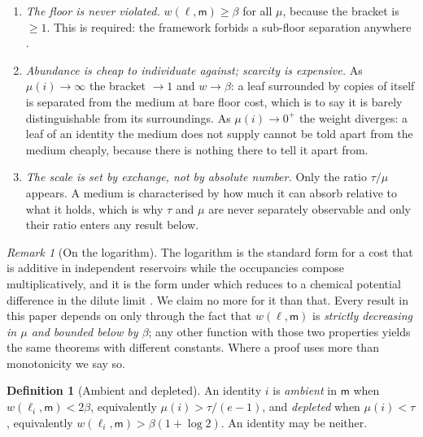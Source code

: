 \documentclass[11pt,twocolumn,a4paper]{article}
\theoremstyle{thmstyle}
\theoremstyle{definition}
\newtheorem{definition}[theorem]{Definition}
\theoremstyle{remark}
\newtheorem{remark}[theorem]{Remark}
\newcommand{\flo}{\beta}
\newcommand{\med}{\mathsf{m}}
\begin{document}
\begin{enumerate}[leftmargin=1.6em,itemsep=2pt]
\item \emph{The floor is never violated.} $w(\ell,\med)\ge\flo$ for all
$\mu$, because the bracket is $\ge 1$. This is required: the framework
forbids a sub-floor separation anywhere
\citep[Thm.~4.3]{sachikonye2026shakespeare}.

\item \emph{Abundance is cheap to individuate against; scarcity is
expensive.} As $\mu(i)\to\infty$ the bracket $\to 1$ and
$w\to\flo$: a leaf surrounded by copies of itself is separated from the
medium at bare floor cost, which is to say it is barely distinguishable
from its surroundings. As $\mu(i)\to 0^+$ the weight diverges: a leaf of
an identity the medium does not supply cannot be told apart from the
medium cheaply, because there is nothing there to tell it apart from.

\item \emph{The scale is set by exchange, not by absolute number.} Only
the ratio $\tau/\mu$ appears. A medium is characterised by how much it can
absorb relative to what it holds, which is why $\tau$ and $\mu$ are never
separately observable and only their ratio enters any result below.
\end{enumerate}

\begin{remark}[On the logarithm]
\label{rem:log}
The logarithm is the standard form for a cost that is additive in
independent reservoirs while the occupancies compose multiplicatively, and
it is the form under which  reduces to a chemical
potential difference in the dilute limit
\citep{beard2007thermo,noor2013thermodynamics}. We claim no more for it
than that. Every result in this paper depends on 
only through the fact that $w(\ell,\med)$ is \emph{strictly decreasing in
$\mu$ and bounded below by $\flo$}; any other function with those two
properties yields the same theorems with different constants. Where a
proof uses more than monotonicity we say so.
\end{remark}

\begin{definition}[Ambient and depleted]
\label{def:depleted}
An identity $i$ is \emph{ambient} in $\med$ when
$w(\ell_i,\med) < 2\flo$, equivalently $\mu(i) > \tau/(e-1)$, and
\emph{depleted} when $\mu(i) < \tau$, equivalently
$w(\ell_i,\med) > \flo(1+\log 2)$. An identity may be neither.
\end{definition}
\end{document}
